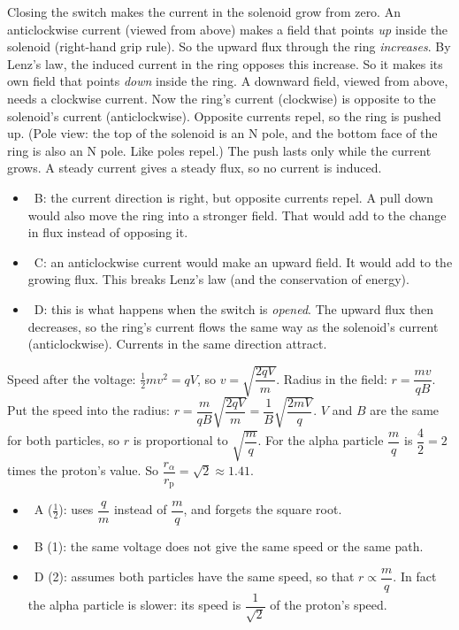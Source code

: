 \begin{practiceanswers}
\begin{practiceans}
  Closing the switch makes the current in the solenoid grow from zero. An anticlockwise
  current (viewed from above) makes a field that points \emph{up} inside the solenoid
  (right-hand grip rule). So the upward flux through the ring \emph{increases}. By Lenz's
  law, the induced current in the ring opposes this increase. So it makes its own field
  that points \emph{down} inside the ring. A downward field, viewed from above, needs a
  clockwise current. Now the ring's current (clockwise) is opposite to the solenoid's
  current (anticlockwise). Opposite currents repel, so the ring is pushed up. (Pole view: the
  top of the solenoid is an N pole, and the bottom face of the ring is also an N pole. Like
  poles repel.) The push lasts only while the current grows. A steady current gives a steady
  flux, so no current is induced.
  \begin{itemize}
    \item \xmark\ B: the current direction is right, but opposite currents repel. A pull down
          would also move the ring into a stronger field. That would add to the change in
          flux instead of opposing it.
    \item \xmark\ C: an anticlockwise current would make an upward field. It would add to
          the growing flux. This breaks Lenz's law (and the conservation of energy).
    \item \xmark\ D: this is what happens when the switch is \emph{opened}. The upward flux
          then decreases, so the ring's current flows the same way as the solenoid's
          current (anticlockwise). Currents in the same direction attract.
  \end{itemize}
\end{practiceans}

\begin{practiceans}
  Speed after the voltage: $\frac{1}{2}mv^2 = qV$, so $v = \sqrt{\dfrac{2qV}{m}}$. Radius
  in the field: $r = \dfrac{mv}{qB}$. Put the speed into the radius:
  $r = \dfrac{m}{qB}\sqrt{\dfrac{2qV}{m}} = \dfrac{1}{B}\sqrt{\dfrac{2mV}{q}}$.
  $V$ and $B$ are the same for both particles, so $r$ is proportional to
  $\sqrt{\dfrac{m}{q}}$. For the alpha particle $\dfrac{m}{q}$ is
  $\dfrac{4}{2} = 2$ times the proton's value. So
  $\dfrac{r_\alpha}{r_\mathrm{p}} = \sqrt{2} \approx 1.41$.
  \begin{itemize}
    \item \xmark\ A ($\frac{1}{2}$): uses $\dfrac{q}{m}$ instead of $\dfrac{m}{q}$, and
          forgets the square root.
    \item \xmark\ B (1): the same voltage does not give the same speed or the same path.
    \item \xmark\ D (2): assumes both particles have the same speed, so that
          $r \propto \dfrac{m}{q}$. In fact the alpha particle is slower: its speed is
          $\dfrac{1}{\sqrt{2}}$ of the proton's speed.
  \end{itemize}
\end{practiceans}


\end{practiceanswers}
